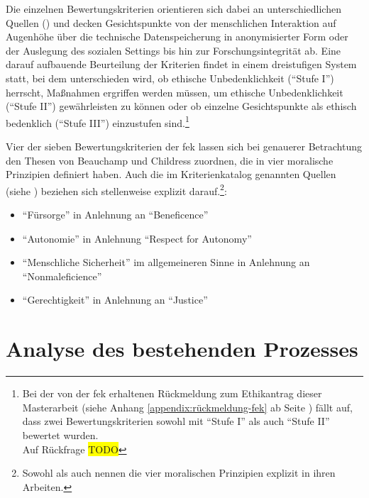 \documentclass[a4paper,12pt,twoside]{scrreprt}
\begin{document}
Die einzelnen Bewertungskriterien orientieren sich dabei an unterschiedlichen Quellen (\cite{manzeschke_meestar_2015, marckmann_was_2000, schuchter_care_2018}) und decken Gesichtspunkte von der menschlichen Interaktion auf Augenhöhe über die technische Datenspeicherung in anonymisierter Form oder der Auslegung des sozialen Settings bis hin zur Forschungsintegrität ab. Eine darauf aufbauende Beurteilung der Kriterien findet in einem dreistufigen System statt, bei dem unterschieden wird, ob ethische Unbedenklichkeit (\enquote{Stufe I}) herrscht, Maßnahmen ergriffen werden müssen, um ethische Unbedenklichkeit (\enquote{Stufe II}) gewährleisten zu können oder ob einzelne Gesichtspunkte als ethisch bedenklich (\enquote{Stufe III}) einzustufen sind.\footnote{Bei der von der \acl{fek} erhaltenen Rückmeldung zum Ethikantrag dieser Masterarbeit (siehe Anhang \ref{appendix:rückmeldung-fek} ab Seite \pageref{appendix:rückmeldung-fek}) fällt auf, dass zwei Bewertungskriterien sowohl mit \enquote{Stufe I} als auch \enquote{Stufe II} bewertet wurden. \\ Auf Rückfrage \colorbox{yellow}{TODO}} \cite[1]{forschungsethik-kommission_der_fachhochschule_vorarlberg_kriterienkatalog_2021}

\medskip

Vier der sieben Bewertungskriterien der \ac{fek} lassen sich bei genauerer Betrachtung den Thesen von Beauchamp und Childress zuordnen, die in \cite{beauchamp_principles_1994} vier moralische Prinzipien definiert haben. Auch die im Kriterienkatalog genannten Quellen (siehe \cite[2]{forschungsethik-kommission_der_fachhochschule_vorarlberg_kriterienkatalog_2021}) beziehen sich stellenweise explizit darauf.\footnote{Sowohl \cite{marckmann_was_2000} als auch \cite{schuchter_care_2018} nennen die vier moralischen Prinzipien explizit in ihren Arbeiten.}:
\begin{itemize}
    \item \enquote{Fürsorge} in Anlehnung an \enquote{Beneficence}
    \item \enquote{Autonomie} in Anlehnung \enquote{Respect for Autonomy}
    \item \enquote{Menschliche Sicherheit} im allgemeineren Sinne in Anlehnung an \enquote{Nonmaleficience}
    \item \enquote{Gerechtigkeit} in Anlehnung an \enquote{Justice}
\end{itemize}

\chapter{Analyse des bestehenden Prozesses}
\label{chap:analyse-bestehender-prozess}
\end{document}
